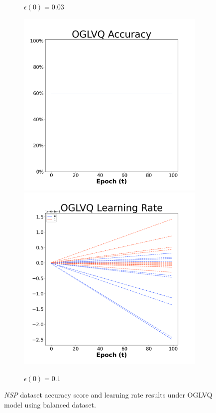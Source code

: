 \begin{figure}[H]
\begin{subfigure}{0.3\textwidth}
\caption{$\epsilon(0)=0.03$}
\end{subfigure}\hfil %
\begin{subfigure}{0.3\textwidth}
\includegraphics[width=\linewidth]{images/exper1/NSP/OGLVQ_0.1_acc.png}
\includegraphics[width=\linewidth]{images/exper1/NSP/OGLVQ_0.1_lr.png}
\caption{$\epsilon(0)=0.1$}
\end{subfigure}

\caption{\textit{NSP} dataset accuracy score and learning rate results under OGLVQ model using balanced dataset.}
\end{figure}


